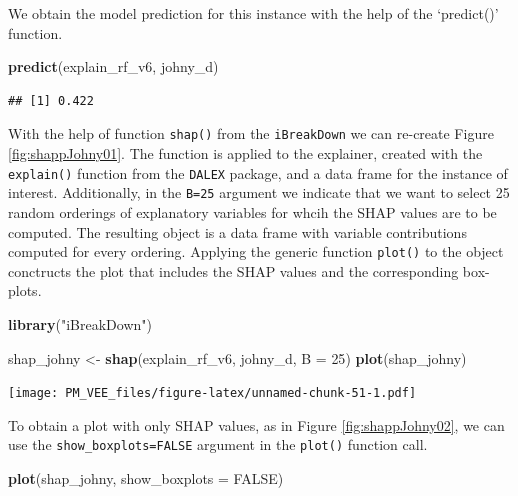 \documentclass[12pt,]{krantz}
\newenvironment{Shaded}{\begin{snugshade}}{\end{snugshade}}
\newcommand{\DataTypeTok}[1]{\textcolor[rgb]{0.13,0.29,0.53}{#1}}
\newcommand{\DecValTok}[1]{\textcolor[rgb]{0.00,0.00,0.81}{#1}}
\newcommand{\KeywordTok}[1]{\textcolor[rgb]{0.13,0.29,0.53}{\textbf{#1}}}
\newcommand{\NormalTok}[1]{#1}
\newcommand{\OtherTok}[1]{\textcolor[rgb]{0.56,0.35,0.01}{#1}}
\newcommand{\StringTok}[1]{\textcolor[rgb]{0.31,0.60,0.02}{#1}}
\begin{document}
We obtain the model prediction for this instance with the help of the `predict()' function.

\begin{Shaded}
\begin{Highlighting}[]
\KeywordTok{predict}\NormalTok{(explain_rf_v6, johny_d)}
\end{Highlighting}
\end{Shaded}

\begin{verbatim}
## [1] 0.422
\end{verbatim}

With the help of function \texttt{shap()} from the \texttt{iBreakDown} we can re-create Figure \ref{fig:shappJohny01}. The function is applied to the explainer, created with the \texttt{explain()} function from the \texttt{DALEX} package, and a data frame for the instance of interest. Additionally, in the \texttt{B=25} argument we indicate that we want to select 25 random orderings of explanatory variables for whcih the SHAP values are to be computed. The resulting object is a data frame with variable contributions computed for every ordering. Applying the generic function \texttt{plot()} to the object conctructs the plot that includes the SHAP values and the corresponding box-plots.

\begin{Shaded}
\begin{Highlighting}[]
\KeywordTok{library}\NormalTok{(}\StringTok{"iBreakDown"}\NormalTok{)}

\NormalTok{shap_johny <-}\StringTok{ }\KeywordTok{shap}\NormalTok{(explain_rf_v6, johny_d, }\DataTypeTok{B =} \DecValTok{25}\NormalTok{)}
\KeywordTok{plot}\NormalTok{(shap_johny) }
\end{Highlighting}
\end{Shaded}

\texttt{[image: PM\_VEE\_files/figure-latex/unnamed-chunk-51-1.pdf]}

To obtain a plot with only SHAP values, as in Figure \ref{fig:shappJohny02}, we can use the \texttt{show\_boxplots=FALSE} argument in the \texttt{plot()} function call.

\begin{Shaded}
\begin{Highlighting}[]
\KeywordTok{plot}\NormalTok{(shap_johny, }\DataTypeTok{show_boxplots =} \OtherTok{FALSE}\NormalTok{) }
\end{Highlighting}
\end{Shaded}
\end{document}
